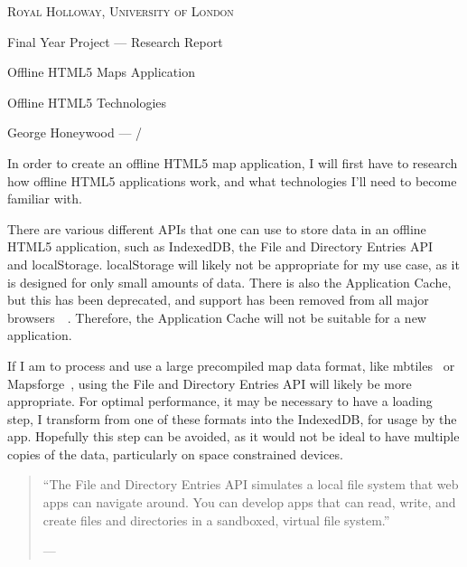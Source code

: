 \documentclass[a4paper,12pt]{article} %
\begin{document}
{
\centering
{\scshape\large Royal Holloway, University of London\par}
\vspace{0.5cm}
{\Huge Final Year Project --- Research Report\par}
\vspace{0.2cm}
{\Large Offline HTML5 Maps Application\par}
\vspace{0.2cm}
{\Huge Offline HTML5 Technologies\par}
\vspace{0.5cm}
{\large George Honeywood --- \the\month/\the\year\par}
\vspace{0.5cm}
}

In order to create an offline HTML5 map application, I will first have to research how offline HTML5 applications work, and what technologies I'll need to become familiar with.

There are various different APIs that one can use to store data in an offline HTML5 application, such as IndexedDB, the File and Directory Entries API~\cite{w3c-file-directories-api}~\cite{mdn-file-directories-api} and localStorage. localStorage will likely not be appropriate for my use case, as it is designed for only small amounts of data. There is also the Application Cache, but this has been deprecated, and support has been removed from all major browsers~\cite{whatwg-application-cache}~\cite{mdn-application-cache}. Therefore, the Application Cache will not be suitable for a new application.

If I am to process and use a large precompiled map data format, like mbtiles~\cite{mbtiles-spec} or Mapsforge~\cite{mapsforge-spec}, using the File and Directory Entries API will likely be more appropriate. For optimal performance, it may be necessary to have a loading step, I transform from one of these formats into the IndexedDB, for usage by the app. Hopefully this step can be avoided, as it would not be ideal to have multiple copies of the data, particularly on space constrained devices.

\begin{quote}
    ``The File and Directory Entries API simulates a local file system that web apps can navigate around. You can develop apps that can read, write, and create files and directories in a sandboxed, virtual file system.''
    
    \footnotesize{--- }
\end{quote}
\end{document}
